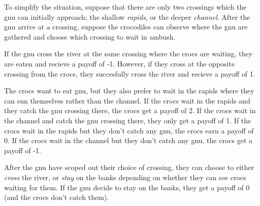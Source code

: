 \documentclass[addpoints]{exam}
\begin{document}
\begin{questions}
To simplify the situation, suppose that there are only two crossings which the gnu can initially approach;
the shallow \textit{rapids}, or the deeper \textit{channel}.
After the gnu arrive at a crossing, suppose the crocodiles can observe where the gnu are gathered and choose which crossing to wait in ambush.

If the gnu cross the river at the same crossing where the crocs are waiting, they are eaten and recieve a payoff of -1.
However, if they cross at the opposite crossing from the crocs, they succesfully cross the river and recieve a payoff of 1.

The crocs want to eat gnu, but they also prefer to wait in the rapids where they can sun themselves rather than the channel.
If the crocs wait in the rapids and they catch the gnu crossing there, the crocs get a payoff of 2.
If the crocs wait in the channel and catch the gnu crossing there, they only get a payoff of 1.
If the crocs wait in the rapids but they don't catch any gnu, the crocs earn a payoff of 0.
If the crocs wait in the channel but they don't catch any gnu, the crocs get a payoff of -1.

After the gnu have scoped out their choice of crossing, they can choose to either \textit{cross} the river, or \textit{stay} on the banks depending on whether they can see crocs waiting for them.
If the gnu decide to stay on the banks, they get a payoff of 0 (and the crocs don't catch them).

\end{questions}
\end{document}
